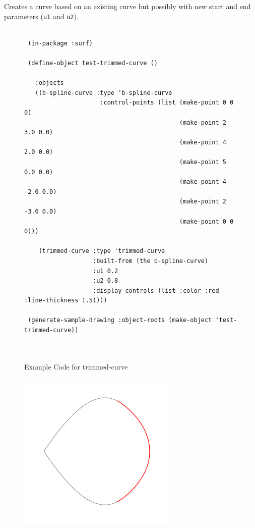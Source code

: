 \documentclass [11pt]{book}
\begin{document}
\begin{itemize}
\begin{description}
Creates a curve based on an existing curve but possibly with new start and end parameters (\texttt{u1} and \texttt{u2}).



\end{description}




\begin{figure}
\begin{lrbox}{\boxedverb}
\begin{minipage}{\linewidth}
{\small

\begin{verbatim}
  
 (in-package :surf)

 (define-object test-trimmed-curve ()

   :objects
   ((b-spline-curve :type 'b-spline-curve
                     :control-points (list (make-point 0 0 0)
                                           (make-point 2 3.0 0.0) 
                                           (make-point 4 2.0 0.0) 
                                           (make-point 5 0.0 0.0) 
                                           (make-point 4 -2.0 0.0) 
                                           (make-point 2 -3.0 0.0) 
                                           (make-point 0 0 0)))
    
    (trimmed-curve :type 'trimmed-curve
                   :built-from (the b-spline-curve)
                   :u1 0.2
                   :u2 0.8
                   :display-controls (list :color :red :line-thickness 1.5))))

 (generate-sample-drawing :object-roots (make-object 'test-trimmed-curve))

   
\end{verbatim}}
\end{minipage}
\end{lrbox}
\fbox{\usebox{\boxedverb}}

\caption{Example Code for trimmed-curve}

\label{fig:example-code-trimmed-curve}

\end{figure}

\begin{figure}
\begin{center}
\includegraphics[width=3in,height=3in]{../images/example-trimmed-curve.pdf}
\end{center}


\end{figure}
\end{itemize}
\end{document}
